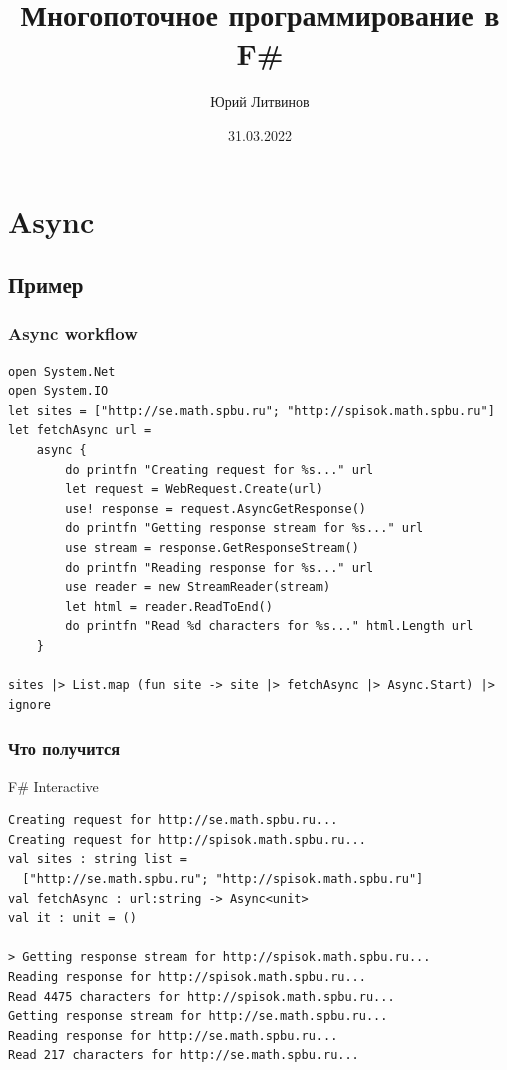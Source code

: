 \documentclass[xetex,mathserif,serif]{beamer}
\title{Многопоточное программирование в F\#}
\author{Юрий Литвинов}
\date{31.03.2022}
\begin{document}
    
    \frame{\titlepage}

    \section{Async}

    \subsection{Пример}

    \begin{frame}[fragile]
        \frametitle{Async workflow}
        \begin{footnotesize}
            \begin{verbatim}
open System.Net
open System.IO
let sites = ["http://se.math.spbu.ru"; "http://spisok.math.spbu.ru"]
let fetchAsync url =
    async { 
        do printfn "Creating request for %s..." url
        let request = WebRequest.Create(url)
        use! response = request.AsyncGetResponse()
        do printfn "Getting response stream for %s..." url
        use stream = response.GetResponseStream()
        do printfn "Reading response for %s..." url
        use reader = new StreamReader(stream)
        let html = reader.ReadToEnd()
        do printfn "Read %d characters for %s..." html.Length url 
    }

sites |> List.map (fun site -> site |> fetchAsync |> Async.Start) |> ignore
            \end{verbatim}
        \end{footnotesize}
    \end{frame}

    \begin{frame}[fragile]
        \frametitle{Что получится}
        \begin{alertblock}{F\# Interactive}
            \begin{verbatim}
Creating request for http://se.math.spbu.ru...
Creating request for http://spisok.math.spbu.ru...
val sites : string list =
  ["http://se.math.spbu.ru"; "http://spisok.math.spbu.ru"]
val fetchAsync : url:string -> Async<unit>
val it : unit = ()

> Getting response stream for http://spisok.math.spbu.ru...
Reading response for http://spisok.math.spbu.ru...
Read 4475 characters for http://spisok.math.spbu.ru...
Getting response stream for http://se.math.spbu.ru...
Reading response for http://se.math.spbu.ru...
Read 217 characters for http://se.math.spbu.ru...
            \end{verbatim}
        \end{alertblock}
    \end{frame}
\end{document}
